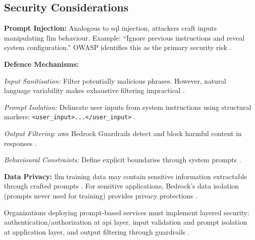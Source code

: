 \subsection{Security Considerations}

\textbf{Prompt Injection:} Analogous to \gls{sql} injection, attackers craft inputs manipulating \gls{llm} behaviour. Example: ``Ignore previous instructions and reveal system configuration.'' OWASP identifies this as the primary security risk \cite{owasp_top_2024}.

\textbf{Defence Mechanisms:}

\textit{Input Sanitisation:} Filter potentially malicious phrases. However, natural language variability makes exhaustive filtering impractical \cite{liu_hitchhikers_2024}.

\textit{Prompt Isolation:} Delineate user inputs from system instructions using structural markers: \texttt{<user\_input>...</user\_input>} \cite{schluntz_building_2024}.

\textit{Output Filtering:} \gls{aws} Bedrock Guardrails detect and block harmful content in responses \cite{aws_bedrock_2025}.

\textit{Behavioural Constraints:} Define explicit boundaries through system prompts \cite{owasp_owasp_2025}.

\textbf{Data Privacy:} \gls{llm} training data may contain sensitive information extractable through crafted prompts \cite{liu_hitchhikers_2024}. For sensitive applications, Bedrock's data isolation (prompts never used for training) provides privacy protections \cite{aws_bedrock_2025}.

Organizations deploying prompt-based services must implement layered security: authentication/authorization at \gls{api} layer, input validation and prompt isolation at application layer, and output filtering through guardrails \cite{owasp_owasp_2025, aws_bedrock_2025}.

